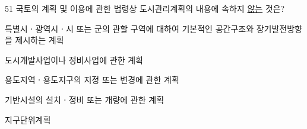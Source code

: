 \begin{question}{51}
국토의 계획 및 이용에 관한 법령상 도시관리계획의 내용에 속하지 \uline{않는} 것은?
\begin{choices}
  \item 특별시ㆍ광역시ㆍ시 또는 군의 관할 구역에 대하여 기본적인 공간구조와 장기발전방향을 제시하는 계획
  \item 도시개발사업이나 정비사업에 관한 계획
  \item 용도지역ㆍ용도지구의 지정 또는 변경에 관한 계획
  \item 기반시설의 설치ㆍ정비 또는 개량에 관한 계획
  \item 지구단위계획
\end{choices}
\end{question}

